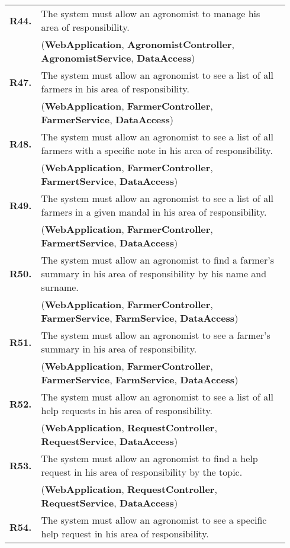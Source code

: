 \begin{longtable}{p{0.06\linewidth} p{0.88\linewidth}}
	\textbf{R44.} & The system must allow an agronomist to manage his area of responsibility.\\
	& (\textbf{WebApplication}, \textbf{AgronomistController}, \textbf{AgronomistService}, \textbf{DataAccess})\\
	\textbf{R47.} & The system must allow an agronomist to see a list of all farmers in his area of responsibility.\\
	& (\textbf{WebApplication}, \textbf{FarmerController}, \textbf{FarmerService}, \textbf{DataAccess})\\
	\textbf{R48.} & The system must allow an agronomist to see a list of all farmers with a specific note in his area of responsibility.\\
	& (\textbf{WebApplication}, \textbf{FarmerController}, \textbf{FarmertService}, \textbf{DataAccess})\\
	\textbf{R49.} & The system must allow an agronomist to see a list of all farmers in a given mandal in his area of responsibility.\\
	& (\textbf{WebApplication}, \textbf{FarmerController}, \textbf{FarmertService}, \textbf{DataAccess})\\
	\textbf{R50.} & The system must allow an agronomist to find a farmer's summary in his area of responsibility by his name and surname.\\
	& (\textbf{WebApplication}, \textbf{FarmerController}, \textbf{FarmerService}, \textbf{FarmService}, \textbf{DataAccess})\\
	\textbf{R51.} & The system must allow an agronomist to see a farmer's summary in his area of responsibility.\\
	& (\textbf{WebApplication}, \textbf{FarmerController}, \textbf{FarmerService}, \textbf{FarmService}, \textbf{DataAccess})\\
	\textbf{R52.} & The system must allow an agronomist to see a list of all help requests in his area of responsibility.\\
	& (\textbf{WebApplication}, \textbf{RequestController}, \textbf{RequestService}, \textbf{DataAccess})\\
	\textbf{R53.} & The system must allow an agronomist to find a help request in his area of responsibility by the topic.\\
	& (\textbf{WebApplication}, \textbf{RequestController}, \textbf{RequestService}, \textbf{DataAccess})\\
	\textbf{R54.} & The system must allow an agronomist to see a specific help request in his area of responsibility.\\

\end{longtable}
